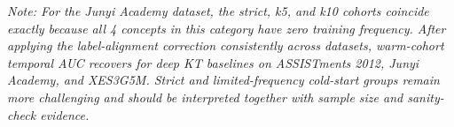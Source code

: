 \begin{tableorg}[htbp]
{\begin{tabular}{lllcrcccccc}
\end{tabular}
}

\vspace{1ex}
\noindent\footnotesize \textit{Note: For the Junyi Academy dataset, the strict, k5, and k10 cohorts coincide exactly because all 4 concepts in this category have zero training frequency. After applying the label-alignment correction consistently across datasets, warm-cohort temporal AUC recovers for deep KT baselines on ASSISTments 2012, Junyi Academy, and XES3G5M. Strict and limited-frequency cold-start groups remain more challenging and should be interpreted together with sample size and sanity-check evidence.}

\end{tableorg}
